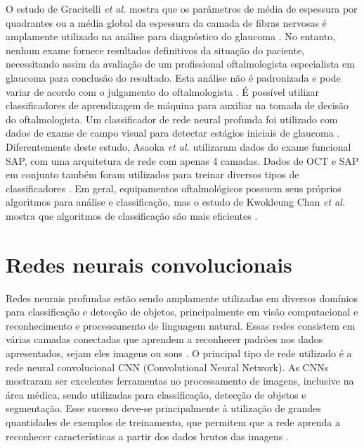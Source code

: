 \documentclass[conference]{IEEEtran}
\begin{document}
O estudo de Gracitelli \textit{et al.} mostra que os parâmetros de média de espessura por quadrantes ou a média global da espessura da camada de fibras nervosas é amplamente utilizado na análise para diagnóstico do glaucoma \cite{Gracitelli2015}. No entanto, nenhum exame fornece resultados definitivos da situação do paciente, necessitando assim da avaliação de um profissional oftalmologista especialista em glaucoma para conclusão do resultado. Esta análise não é padronizada e pode variar de acordo com o julgamento do oftalmologista \cite{kroese2003}. É possível utilizar classificadores de aprendizagem de máquina para auxiliar na tomada de decisão do oftalmologista. Um classificador de rede neural profunda foi utilizado com dados de exame de campo visual para detectar estágios iniciais de glaucoma \cite{Asaoka2016}. Diferentemente deste estudo, Asaoka \textit{et al.} utilizaram dados do exame funcional SAP, com uma arquitetura de rede com apenas 4 camadas. Dados de OCT e SAP em conjunto também foram utilizados para treinar diversos tipos de classificadores \cite{bowd2008, silva2013}. Em geral, equipamentos oftalmológicos possuem seus próprios algoritmos para análise e classificação, mas o estudo de Kwokleung Chan \textit{et al.} mostra que algoritmos de classificação são mais eficientes \cite{kwokleung2002}.


\section{Redes neurais convolucionais}


Redes neurais profundas estão sendo amplamente utilizadas em diversos domínios para classificação e detecção de objetos, principalmente em visão computacional e reconhecimento e processamento de linguagem natural. Essas redes consistem em várias camadas conectadas que aprendem a reconhecer padrões nos dados apresentados, sejam eles imagens ou sons \cite{LeCun2015}. O principal tipo de rede utilizado é a rede neural convolucional CNN (Convolutional Neural Network). As CNNs mostraram ser excelentes ferramentas no processamento de imagens, inclusive na área médica, sendo utilizadas para classificação, detecção de objetos e segmentação. Esse sucesso deve-se principalmente à utilização de grandes quantidades de exemplos de treinamento, que permitem que a rede aprenda a reconhecer características a partir dos dados brutos das imagens \cite{greenspan2016}. %
\end{document}
